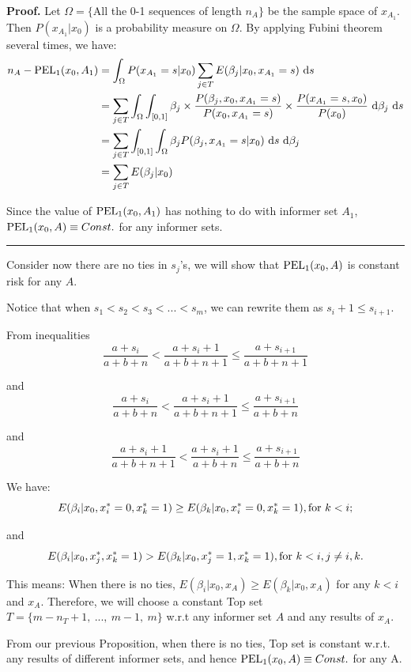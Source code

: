 \documentclass[12pt]{article}
\newenvironment{proof}[1][Proof]{\noindent\textbf{#1.} }{\ \rule{0.5em}{0.5em}}
\begin{document}
\begin{proof}
Let $\Omega = \{$All the 0-1 sequences of length $n_A \}$ be the sample space of $x_{A_1}$. Then $P(x_{A_1}|x_0)$ is a probability measure on $\Omega$. By applying Fubini theorem several times, we have: 
\begin{align*}
    n_A - {\rm PEL}_1(x_0, A_1) &= \int_\Omega P(x_{A_1} = s|x_0)\sum_{j\in T} E(\beta_j|x_0, x_{A_1} = s) ~{\rm d}s\\
    &= \sum_{j\in T} \int_\Omega \int_{[0,1]} \beta_j \times \frac{P(\beta_j,x_0,x_{A_1}=s )}{P(x_0,x_{A_1} = s)}\times \frac{P(x_{A_1} = s, x_0)}{P(x_0)}~{\rm d}\beta_j~{\rm d}s\\
    &= \sum_{j \in T} \int_{[0,1]}\int_\Omega \beta_j P(\beta_j, x_{A_1} = s|x_0) ~{\rm d}s~{\rm d}\beta_j\\
    &= \sum_{j\in T}E(\beta_j|x_0)
\end{align*}

Since the value of ${\rm PEL}_1(x_0,A_1)$ has nothing to do with informer set $A_1$, ${\rm PEL}_1(x_0, A) \equiv Const.$ for any informer sets.
\end{proof}

Consider now there are no ties in $s_j$'s, we will show that ${\rm PEL}_1(x_0, A)$ is constant risk for any $A$.

Notice that when $s_1 < s_2 < s_3 <...<s_m$, we can rewrite them as $s_i + 1\leq s_{i+1}$.

From inequalities 
$$
\frac{a+s_i}{a+b+n} < \frac{a+s_i+1}{a+b+n+1} \leq \frac{a+s_{i+1}}{a+b+n+1}
$$

and 
$$
\frac{a+s_i}{a+b+n} <
\frac{a+s_i+1}{a+b+n+1} \leq \frac{a+s_{i+1}}{a+b+n}
$$

and 
$$
\frac{a+s_i+1}{a+b+n+1} < \frac{a+s_i+1}{a+b+n} \leq \frac{a+s_{i+1}}{a+b+n}
$$

We have:
$$
E(\beta_i|x_0, x_i^* = 0, x_k^* = 1) \geq
E(\beta_k|x_0,x_i^* = 0, x_k^* = 1), {\rm for}~k < i;
$$

and
$$
E(\beta_i|x_0, x_j^*, x_k^* = 1) > E(\beta_k|x_0,x_j^* = 1, x_k^* = 1), {\rm for}~k < i, j \neq i,k.
$$

This means: When there is no ties, $E(\beta_i|x_0, x_A) \geq E(\beta_k|x_0, x_A)$ for any $k < i$ and $x_A$. Therefore, we will choose a constant Top set $T = \{m-n_T+1,~...,~m-1,~m\}$ w.r.t any informer set $A$ and any results of $x_A$. 

From our previous Proposition, when there is no ties, Top set is constant w.r.t. any results of different informer sets, and hence ${\rm PEL}_1(x_0, A)\equiv Const.$ for any A. 
\end{document}
